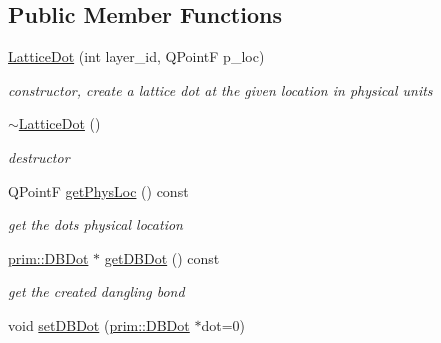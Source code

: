 \subsection*{Public Member Functions}
\begin{DoxyCompactItemize}
\item 
\hyperlink{classprim_1_1LatticeDot_ad4dfe6d2c15e4cd9f291003845820950}{Lattice\+Dot} (int layer\+\_\+id, Q\+PointF p\+\_\+loc)\hypertarget{classprim_1_1LatticeDot_ad4dfe6d2c15e4cd9f291003845820950}{}\label{classprim_1_1LatticeDot_ad4dfe6d2c15e4cd9f291003845820950}

\begin{DoxyCompactList}\small\item\em constructor, create a lattice dot at the given location in physical units \end{DoxyCompactList}\item 
\hyperlink{classprim_1_1LatticeDot_a2e3c21e2ff61dc41aaec30d1e7a94ae1}{$\sim$\+Lattice\+Dot} ()\hypertarget{classprim_1_1LatticeDot_a2e3c21e2ff61dc41aaec30d1e7a94ae1}{}\label{classprim_1_1LatticeDot_a2e3c21e2ff61dc41aaec30d1e7a94ae1}

\begin{DoxyCompactList}\small\item\em destructor \end{DoxyCompactList}\item 
Q\+PointF \hyperlink{classprim_1_1LatticeDot_aa11ad28b8d3524622e686e4f2c6aa5ee}{get\+Phys\+Loc} () const \hypertarget{classprim_1_1LatticeDot_aa11ad28b8d3524622e686e4f2c6aa5ee}{}\label{classprim_1_1LatticeDot_aa11ad28b8d3524622e686e4f2c6aa5ee}

\begin{DoxyCompactList}\small\item\em get the dots physical location \end{DoxyCompactList}\item 
\hyperlink{classprim_1_1DBDot}{prim\+::\+D\+B\+Dot} $\ast$ \hyperlink{classprim_1_1LatticeDot_a88d99a155ee489d376377441a041c709}{get\+D\+B\+Dot} () const \hypertarget{classprim_1_1LatticeDot_a88d99a155ee489d376377441a041c709}{}\label{classprim_1_1LatticeDot_a88d99a155ee489d376377441a041c709}

\begin{DoxyCompactList}\small\item\em get the created dangling bond \end{DoxyCompactList}\item 
void \hyperlink{classprim_1_1LatticeDot_a2c0cc2994be5dd8f23d7b2e832a88e8f}{set\+D\+B\+Dot} (\hyperlink{classprim_1_1DBDot}{prim\+::\+D\+B\+Dot} $\ast$dot=0)\hypertarget{classprim_1_1LatticeDot_a2c0cc2994be5dd8f23d7b2e832a88e8f}{}\label{classprim_1_1LatticeDot_a2c0cc2994be5dd8f23d7b2e832a88e8f}


\end{DoxyCompactItemize}

